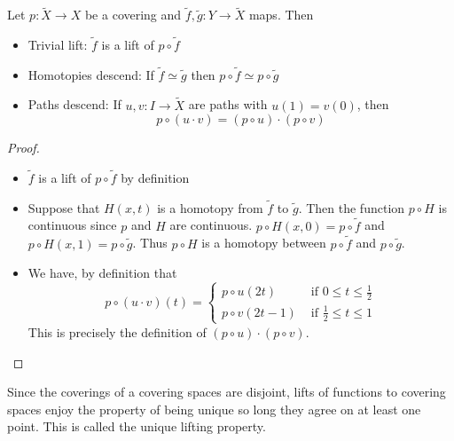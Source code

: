 \documentclass[a4paper]{article}
\begin{document}
\begin{prp}{}{} Let $p:\tilde{X}\to X$ be a covering and $\tilde{f},\tilde{g}:Y\to\tilde{X}$ maps. Then 
\begin{itemize}
\item Trivial lift: $\tilde{f}$ is a lift of $p\circ\tilde{f}$
\item Homotopies descend: If $\tilde{f}\simeq\tilde{g}$ then $p\circ\tilde{f}\simeq p\circ\tilde{g}$
\item Paths descend: If $u,v:I\to\tilde{X}$ are paths with $u(1)=v(0)$, then $$p\circ(u\cdot v)=(p\circ u)\cdot(p\circ v)$$
\end{itemize} \tcbline
\begin{proof}~\\
\begin{itemize}
\item $\tilde{f}$ is a lift of $p\circ\tilde{f}$ by definition
\item Suppose that $H(x,t)$ is a homotopy from $\tilde{f}$ to $\tilde{g}$. Then the function $p\circ H$ is continuous since $p$ and $H$ are continuous. $p\circ H(x,0)=p\circ\tilde{f}$ and $p\circ H(x,1)=p\circ\tilde{g}$. Thus $p\circ H$ is a homotopy between $p\circ\tilde{f}$ and $p\circ\tilde{g}$. 
\item We have, by definition that $$p\circ(u\cdot v)(t)=\begin{cases}
p\circ u(2t) & \text{ if }0\leq t\leq\frac{1}{2}\\
p\circ v(2t-1) & \text{ if }\frac{1}{2}\leq t\leq 1
\end{cases}$$
This is precisely the definition of $(p\circ u)\cdot(p\circ v)$. 
\end{itemize}
\end{proof}
\end{prp}

Since the coverings of a covering spaces are disjoint, lifts of functions to covering spaces enjoy the property of being unique so long they agree on at least one point. This is called the unique lifting property. 
\end{document}
